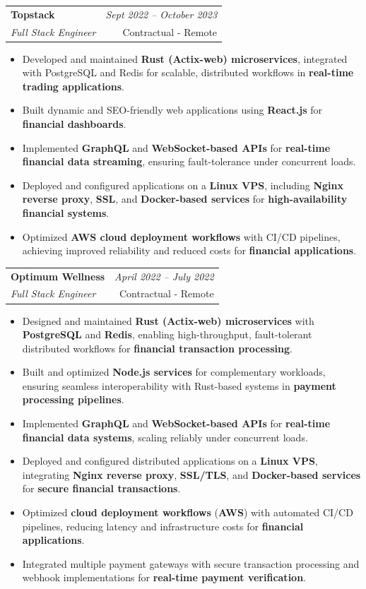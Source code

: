 \documentclass[a4paper,11pt]{article}
\makeatletter
\newcommand{\resumeSubheading}[4]{
\vspace{0.5mm}
    \item[] 
    \begin{tabular*}{0.98\textwidth}[t]{l@{\extracolsep{\fill}}r}
        \textbf{#1} & \textit{\footnotesize{#4}} \\
        \it{\footnotesize{#3}} & \footnotesize{#2} \\
    \end{tabular*}
    \vspace{-2.4mm}
}
\newcommand{\resumeItemListStart}{\begin{justify}\begin{itemize}[leftmargin=3ex, rightmargin=2ex, noitemsep,labelsep=1.2mm,itemsep=0mm]\small}
\newcommand{\resumeItemListEnd}{\end{itemize}\end{justify}\vspace{-2mm}}
\makeatother
\begin{document}
    \vspace{-3.0mm}

    \resumeSubheading
      {Topstack}{Contractual - Remote}
      {Full Stack Engineer}{Sept 2022 -- October 2023}
      \vspace{-2.0mm}
      \resumeItemListStart
          \item Developed and maintained \textbf{Rust (Actix-web) microservices}, integrated with PostgreSQL and Redis for scalable, distributed workflows in \textbf{real-time trading applications}.
          \item {Built dynamic and SEO-friendly web applications using \textbf{React.js} for \textbf{financial dashboards}.}
          \item Implemented \textbf{GraphQL} and \textbf{WebSocket-based APIs} for \textbf{real-time financial data streaming}, ensuring fault-tolerance under concurrent loads.
          \item Deployed and configured applications on a \textbf{Linux VPS}, including \textbf{Nginx reverse proxy}, \textbf{SSL}, and \textbf{Docker-based services} for \textbf{high-availability financial systems}.
          \item Optimized \textbf{AWS cloud deployment workflows} with CI/CD pipelines, achieving improved reliability and reduced costs for \textbf{financial applications}.
 
    \resumeItemListEnd
    
    \vspace{-3.0mm}

    \resumeSubheading
      {Optimum Wellness}{Contractual - Remote}
      {Full Stack Engineer}{April 2022 -- July 2022}
      \vspace{-2.0mm}
      \resumeItemListStart
          \item Designed and maintained \textbf{Rust (Actix-web) microservices} with \textbf{PostgreSQL} and \textbf{Redis}, enabling high-throughput, fault-tolerant distributed workflows for \textbf{financial transaction processing}.
          \item Built and optimized \textbf{Node.js services} for complementary workloads, ensuring seamless interoperability with Rust-based systems in \textbf{payment processing pipelines}.
          \item Implemented \textbf{GraphQL} and \textbf{WebSocket-based APIs} for \textbf{real-time financial data systems}, scaling reliably under concurrent loads.
          \item Deployed and configured distributed applications on a \textbf{Linux VPS}, integrating \textbf{Nginx reverse proxy}, \textbf{SSL/TLS}, and \textbf{Docker-based services} for \textbf{secure financial transactions}.
          \item Optimized \textbf{cloud deployment workflows} (\textbf{AWS}) with automated CI/CD pipelines, reducing latency and infrastructure costs for \textbf{financial applications}.
          \item {Integrated multiple payment gateways with secure transaction processing and webhook implementations for \textbf{real-time payment verification}.} 
    \resumeItemListEnd
    
\end{document}
